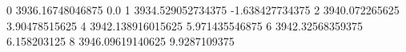 0 3936.16748046875 0.0
1 3934.529052734375 -1.638427734375
2 3940.072265625 3.90478515625
4 3942.138916015625 5.971435546875
6 3942.32568359375 6.158203125
8 3946.09619140625 9.9287109375
